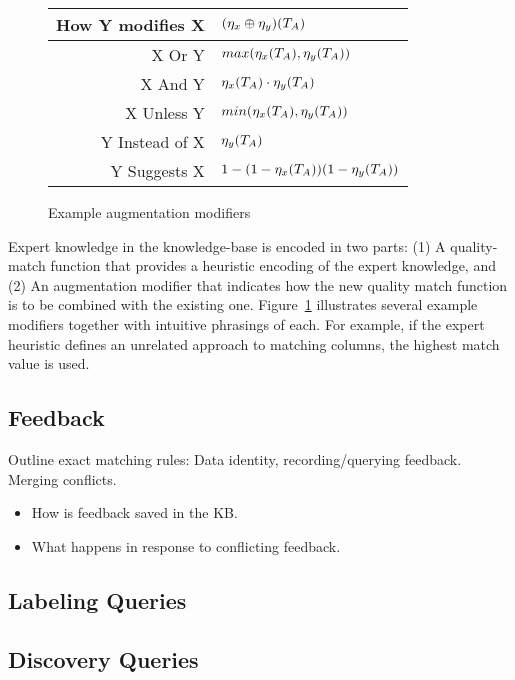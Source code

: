 \begin{figure}
\begin{tabular}{r|l}
\textbf{How Y modifies X} & $(\eta_x \oplus \eta_y)(T_A)$ \\\hline
X Or Y & $max(\eta_x(T_A), \eta_y(T_A))$\\
X And Y & $\eta_x(T_A) \cdot \eta_y(T_A)$\\
X Unless Y & $min(\eta_x(T_A), \eta_y(T_A))$\\
Y Instead of X & $\eta_y(T_A)$\\
Y Suggests X & $1-(1-\eta_x(T_A))(1-\eta_y(T_A))$
\end{tabular}
\caption{Example augmentation modifiers}
\label{fig:modifiers}
\end{figure}

Expert knowledge in the knowledge-base is encoded in two parts: 
(1) A quality-match function that provides a heuristic encoding of the expert knowledge, and 
(2) An augmentation modifier that indicates how the new quality match function is to be combined with the existing one.  
Figure~\ref{fig:modifiers} illustrates several example modifiers together with intuitive phrasings of each.  
For example, if the expert heuristic defines an unrelated approach to matching columns, the highest match value is used.

\subsection{Feedback}

Outline exact matching rules: Data identity, recording/querying feedback.  Merging conflicts.

\begin{itemize}
  \item How is feedback saved in the KB.
  \item What happens in response to conflicting feedback.  
\end{itemize}



\subsection{Labeling Queries}

\subsection{Discovery Queries}
